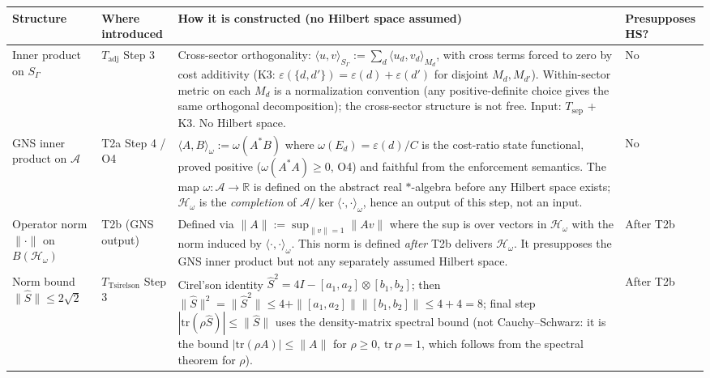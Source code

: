 \documentclass[11pt]{article}
\theoremstyle{remark}
\begin{document}
\medskip
\begin{center}
\smallskip
\small
\begin{tabular}{@{}p{2.2cm}p{2.5cm}p{5.8cm}p{1.2cm}@{}}
\textbf{Structure} & \textbf{Where introduced} & \textbf{How it is constructed (no Hilbert space assumed)} & \textbf{Presupposes HS?} \\[2pt]
\hline\noalign{\smallskip}
Inner product on $S_\Gamma$ & $T_{\mathrm{adj}}$ Step 3 & Cross-sector orthogonality: $\langle u, v\rangle_{S_\Gamma} := \sum_d \langle u_d, v_d\rangle_{M_d}$, with cross terms forced to zero by cost additivity (K3: $\varepsilon(\{d,d'\}) = \varepsilon(d)+\varepsilon(d')$ for disjoint $M_d, M_{d'}$).  Within-sector metric on each $M_d$ is a normalization convention (any positive-definite choice gives the same orthogonal decomposition); the cross-sector structure is not free.  Input: $T_{\mathrm{sep}}$ + K3.  No Hilbert space. & No \\[8pt]
GNS inner product on $\mathcal{A}$ & T2a Step 4 / O4 & $\langle A, B\rangle_\omega := \omega(A^*B)$ where $\omega(E_d) = \varepsilon(d)/C$ is the cost-ratio state functional, proved positive ($\omega(A^*A) \ge 0$, O4) and faithful from the enforcement semantics.  The map $\omega: \mathcal{A} \to \mathbb{R}$ is defined on the abstract real $*$-algebra before any Hilbert space exists; $\mathcal{H}_\omega$ is the \emph{completion} of $\mathcal{A}/\ker\langle\cdot,\cdot\rangle_\omega$, hence an output of this step, not an input. & No \\[8pt]
Operator norm $\|\cdot\|$ on $B(\mathcal{H}_\omega)$ & T2b (GNS output) & Defined via $\|A\| := \sup_{\|v\|=1}\|Av\|$ where the sup is over vectors in $\mathcal{H}_\omega$ with the norm induced by $\langle\cdot,\cdot\rangle_\omega$.  This norm is defined \emph{after} T2b delivers $\mathcal{H}_\omega$.  It presupposes the GNS inner product but not any separately assumed Hilbert space. & After T2b \\[8pt]
Norm bound $\|\hat{S}\| \le 2\sqrt{2}$ & $T_{\mathrm{Tsirelson}}$ Step 3 & Cirel'son identity $\hat{S}^2 = 4I - [a_1,a_2]\otimes[b_1,b_2]$; then $\|\hat{S}\|^2 = \|\hat{S}^2\| \le 4 + \|[a_1,a_2]\|\|[b_1,b_2]\| \le 4+4=8$; final step $|\mathrm{tr}(\rho\hat{S})| \le \|\hat{S}\|$ uses the density-matrix spectral bound (not Cauchy--Schwarz: it is the bound $|\mathrm{tr}(\rho A)| \le \|A\|$ for $\rho \ge 0$, $\mathrm{tr}\,\rho = 1$, which follows from the spectral theorem for $\rho$). & After T2b \\
\end{tabular}
\label{tab:inner_product}
\end{center}
\end{document}

